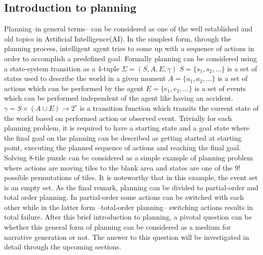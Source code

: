 \documentclass[english]{tktltiki}
\begin{document}
\subsection{Introduction to planning}
Planning--in general terms-- can be considered as one of the well established and old topics in Artificial Intelligence(AI). In the simplest form, through the planning process, intelligent agent tries to come up with a sequence of actions in order to accomplish a predefined goal. Formally planning can be considered using a state-system transition as a 4-tuple $\Sigma = (S,A,E,\gamma)$\newline
$S=\{s_1,s_2,...\}$ is a set of states used to describe the world in a given moment\newline
$A=\{a_1,a_2,...\}$ is a set of actions which can be performed by the agent\newline
$E=\{e_1,e_2,...\}$ is a set of events which can be performed independent of the agent like having an accident.\newline
$\gamma = S\times(A \cup E) \longrightarrow 2^s$ is a transition function which transits the current state of the world based on performed action or observed event. \newline
Trivially for each planning problem, it is required to have a starting state and a goal state where the final goal on the planning can be described as getting started at starting point, executing the planned sequence of actions and reaching the final goal.
Solving 8-tile puzzle can be considered as a simple example of planning problem where actions are moving tiles to the blank area and states are one of the $9!$ possible permutations of tiles. It is noteworthy that in this example, the event set is an empty set.
As the final remark, planning can be divided to partial-order and total order planning. In partial-order some actions can be switched with each other while in the latter form --total-order planning-- switching actions results in total failure.
After this brief introduction to planning, a pivotal question can be whether this general form of planning can be considered as a medium for narrative generation or not. The answer to this question will be investigated in detail through the upcoming sections.
\end{document}
